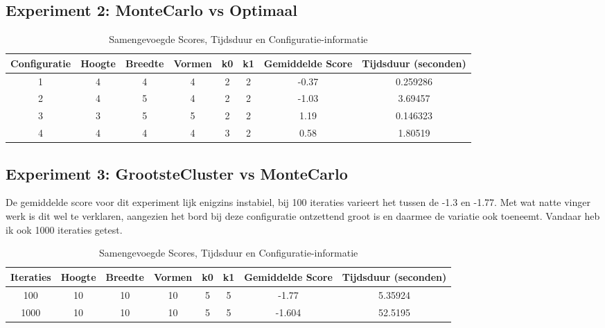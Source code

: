 \documentclass[10pt]{article}
\begin{document}
\subsection{Experiment 2: MonteCarlo vs Optimaal}

\begin{table}[h]
    \centering
    \caption{Samengevoegde Scores, Tijdsduur en Configuratie-informatie}
    \begin{tabular}{@{}cccccccc@{}}
        \toprule
        Configuratie & Hoogte & Breedte & Vormen & k0 & k1 & Gemiddelde Score & Tijdsduur (seconden) \\ 
        \midrule
        1 & 4 & 4 & 4 & 2 & 2 & -0.37 & 0.259286 \\
        2 & 4 & 5 & 4 & 2 & 2 & -1.03 & 3.69457 \\
        3 & 3 & 5 & 5 & 2 & 2 & 1.19 & 0.146323 \\
        4 & 4 & 4 & 4 & 3 & 2 & 0.58 & 1.80519 \\
        \bottomrule
    \end{tabular}
\end{table}
\FloatBarrier

\subsection{Experiment 3: GrootsteCluster vs MonteCarlo }
De gemiddelde score voor dit experiment lijk enigzins instabiel, bij 100 iteraties varieert het tussen de -1.3 en -1.77.
Met wat natte vinger werk is dit wel te verklaren, aangezien het bord bij deze configuratie ontzettend groot is en daarmee de variatie ook toeneemt.
Vandaar heb ik ook 1000 iteraties getest.

\begin{table}[h]
    \centering
    \caption{Samengevoegde Scores, Tijdsduur en Configuratie-informatie}
    \begin{tabular}{@{}cccccccc@{}}
        \toprule
        Iteraties & Hoogte & Breedte & Vormen & k0 & k1 & Gemiddelde Score & Tijdsduur (seconden) \\ 
        \midrule
        100 & 10 & 10 & 10 & 5 & 5 & -1.77 & 5.35924 \\
        1000 & 10 & 10 & 10 & 5 & 5    & -1.604 & 52.5195 \\
        \bottomrule
    \end{tabular}
\end{table}
\FloatBarrier
\end{document}
